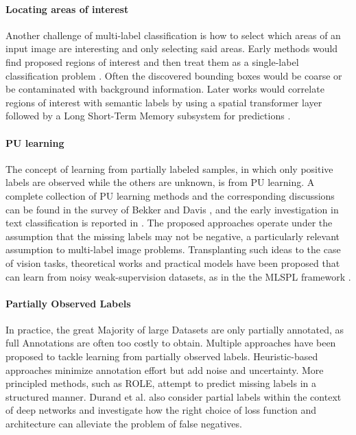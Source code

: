 \documentclass[lettersize,journal]{IEEEtran}
\begin{document}
\paragraph{Locating areas of interest}
Another challenge of multi-label classification is how to select which areas of an input image are interesting and only selecting said areas. Early methods would find proposed regions of interest and then treat them as a single-label classification problem \cite{HCP}. Often the discovered bounding boxes would be coarse or be contaminated with background information. Later works would correlate regions of interest with semantic labels by using a spatial transformer layer followed by a Long Short-Term Memory subsystem for predictions \cite{ltsm}.


\paragraph{PU learning} 

The concept of learning from partially labeled samples, in which only positive labels are observed while the others are unknown, is from PU learning. A complete collection of PU learning methods and the corresponding discussions can be found in the survey of Bekker and Davis \cite{Bekker_2020}, and the early investigation in text classification is reported in \cite{Li_2003}. The proposed approaches operate under the assumption that the missing labels may not be negative, a particularly relevant assumption to multi-label image problems. Transplanting such ideas to the case of vision tasks, theoretical works and practical models have been proposed that can learn from noisy weak-supervision datasets, as in the the MLSPL framework \cite{mlsp}.


\paragraph{Partially Observed Labels}
In practice, the great Majority of large Datasets are only partially annotated, as full Annotations are often too costly to obtain. Multiple approaches have been proposed to tackle learning from partially observed labels. Heuristic-based approaches \cite{mlsp} minimize annotation effort but add noise and uncertainty. More principled methods, such as ROLE, attempt to predict missing labels in a structured manner. Durand et al. \cite{durand2019learningdeepconvnetmultilabel} also consider partial labels within the context of deep networks and investigate how the right choice of loss function and architecture can alleviate the problem of false negatives.
\end{document}
